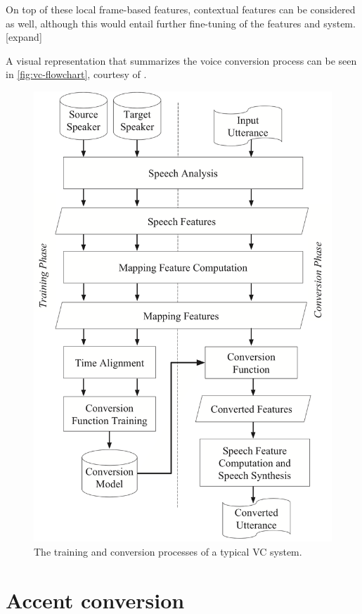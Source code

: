 \documentclass
[
    a4paper,
    twoside,
    12pt
]
{report}
\begin{document}
On top of these local frame-based features, contextual features can be
considered as well, although this would entail further fine-tuning of
the features and system. {[}expand{]}

A visual representation that summarizes the voice conversion process can
be seen in \autoref{fig:vc-flowchart}, courtesy of
\textcite{mohammadi2017}.

\begin{figure}[H]
\centering
\includegraphics[scale=0.25]{img/vc-flowchart.png}
\caption{The training and conversion processes of a typical VC system.}
\label{fig:vc-flowchart}
\end{figure}

\section{Accent conversion}\label{accent-conversion}
\end{document}
